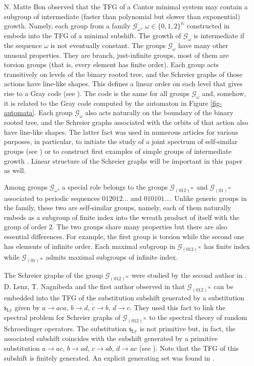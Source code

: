 \documentclass[12pt]{article}
\theoremstyle{definition}
\def\bN{\mathbb{N}}
\def\cG{\mathcal{G}}
\def\om{\omega}
\def\subst{\mathsf{s}}
\begin{document}
N. Matte Bon \cite{MatteBon} observed that the TFG of a Cantor minimal 
system may contain a subgroup of intermediate (faster than polynomial but 
slower than exponential) growth.  Namely, each group from a family 
$\cG_\om$, $\om\in\{0,1,2\}^{\bN}$ constructed in \cite{Grig84} embeds into 
the TFG of a minimal subshift.  The growth of $\cG_\om$ is intermediate if 
the sequence $\om$ is not eventually constant.  The groups $\cG_\om$ have  
many other unusual properties.  They are branch, just-infinite groups, most 
of them are torsion groups (that is, every element has finite order).  Each 
group acts transitively on levels of the binary rooted tree, and the 
Schreier graphs of those actions have line-like shapes.  This defines a 
linear order on each level that gives rise to a Gray code (see 
\cite{MatteBon}).  The code is the same for all groups $\cG_\om$ and, 
somehow, it is related to the Gray code computed by the automaton in Figure 
\ref{fig-automata}.  Each group $\cG_\om$ also acts naturally on the 
boundary of the binary rooted tree, and the Schreier graphs associated with 
the orbits of that action also have line-like shapes.  The latter fact was 
used in numerous articles for various purposes, in particular, to initiate 
the study of a joint spectrum of self-similar groups (see \cite{BarGri00}) 
or to construct first examples of simple groups of intermediate growth 
\cite{Nek16}.  Linear structure of the Schreier graphs will be important in 
this paper as well.

Among groups $\cG_\om$, a special role belongs to the groups 
$\cG_{(012)^\infty}$ and $\cG_{(01)^\infty}$ associated to periodic 
sequences $012012\dots$ and $010101\dots$.  Unlike generic groups in the 
family, these two are self-similar groups, namely, each of them naturally 
embeds as a subgroup of finite index into the wreath product of itself with 
the group of order $2$.  The two groups share many properties but there are 
also essential differences.  For example, the first group is torsion while 
the second one has elements of infinite order.  Each maximal subgroup in 
$\cG_{(012)^\infty}$ has finite index while $\cG_{(01)^\infty}$ admits 
maximal subgroups of infinite index.

The Schreier graphs of the group $\cG_{(012)^\infty}$ were studied by the 
second author in \cite{Vor12}.  D. Lenz, T. Nagnibeda and the first author 
observed in \cite{GLN17} that $\cG_{(012)^\infty}$ can be embedded into the 
TFG of the substitution subshift generated by a substitution 
$\subst_{\mathrm{Ly}}$ given by $a\to aca$, $b\to d$, $c\to b$, $d\to c$.  
They used this fact to link the spectral problem for Schreier graphs of 
$\cG_{(012)^\infty}$ to the spectral theory of random Schroedinger 
operators.  The substitution $\subst_{\mathrm{Ly}}$ is not primitive but, 
in fact, the associated subshift coincides with the subshift generated by a 
primitive substitution $a\to ac$, $b\to ad$, $c\to ab$, $d\to ac$ (see 
\cite{AlloucheDQ:hidden}).  Note that the TFG of this subshift is finitely 
generated.  An explicit generating set was found in \cite{Vor20}.
\end{document}
